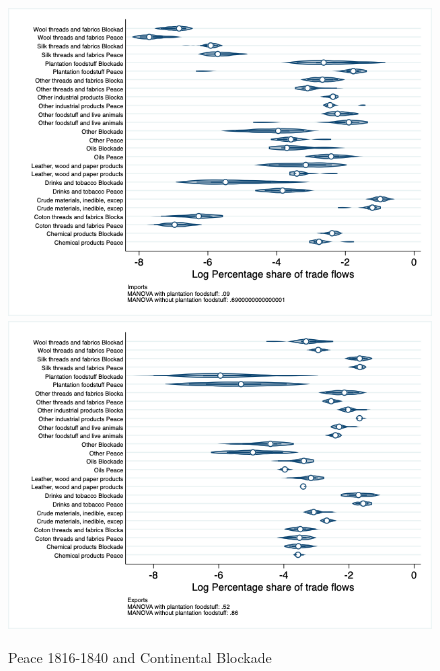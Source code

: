 \documentclass[12pt,a4paper,notitlepage,english]{article}
\begin{document}
\begin{figure}
\centering
\caption{Peace 1816-1840 and Continental Blockade}
\label{peace1816_1840_block_nat_distr}
\includegraphics[scale=.4]{peace1816_1840_block_nat_distr_Isitc}
\includegraphics[scale=.4]{peace1816_1840_block_nat_distr_Xsitc}
\end{figure}
\end{document}
